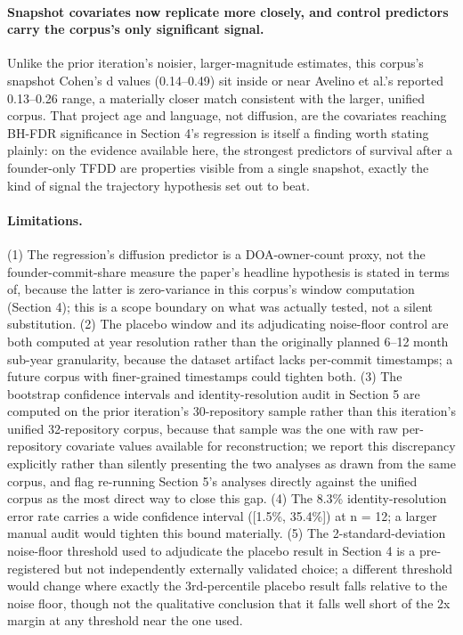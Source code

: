 \documentclass[11pt,letterpaper]{article}
\begin{document}
\paragraph{Snapshot covariates now replicate more closely, and control predictors carry the corpus's only significant signal.} Unlike the prior iteration's noisier, larger-magnitude estimates, this corpus's snapshot Cohen's d values (0.14--0.49) sit inside or near Avelino et al.'s reported 0.13--0.26 range, a materially closer match consistent with the larger, unified corpus. That project age and language, not diffusion, are the covariates reaching BH-FDR significance in Section 4's regression is itself a finding worth stating plainly: on the evidence available here, the strongest predictors of survival after a founder-only TFDD are properties visible from a single snapshot, exactly the kind of signal the trajectory hypothesis set out to beat.

\paragraph{Limitations.} (1) The regression's diffusion predictor is a DOA-owner-count proxy, not the founder-commit-share measure the paper's headline hypothesis is stated in terms of, because the latter is zero-variance in this corpus's window computation (Section 4); this is a scope boundary on what was actually tested, not a silent substitution. (2) The placebo window and its adjudicating noise-floor control are both computed at year resolution rather than the originally planned 6--12 month sub-year granularity, because the dataset artifact lacks per-commit timestamps; a future corpus with finer-grained timestamps could tighten both. (3) The bootstrap confidence intervals and identity-resolution audit in Section 5 are computed on the prior iteration's 30-repository sample rather than this iteration's unified 32-repository corpus, because that sample was the one with raw per-repository covariate values available for reconstruction; we report this discrepancy explicitly rather than silently presenting the two analyses as drawn from the same corpus, and flag re-running Section 5's analyses directly against the unified corpus as the most direct way to close this gap. (4) The 8.3\% identity-resolution error rate carries a wide confidence interval ([1.5\%, 35.4\%]) at n = 12; a larger manual audit would tighten this bound materially. (5) The 2-standard-deviation noise-floor threshold used to adjudicate the placebo result in Section 4 is a pre-registered but not independently externally validated choice; a different threshold would change where exactly the 3rd-percentile placebo result falls relative to the noise floor, though not the qualitative conclusion that it falls well short of the 2x margin at any threshold near the one used.
\end{document}
